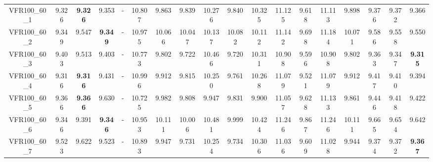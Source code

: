 \begin{tabular}{cc|ccc|ccccccccccccc}
VFR100\_60\_1      & 9.326            & {\bf 9.326}      & 9.353            & -                & 10.807           & 9.863            & 9.839            & 10.276           & 9.840            & 10.325           & 11.125           & 9.618            & 11.113           & 9.898            & 9.376            & 9.372            & 9.366           \\ 
VFR100\_60\_2      & 9.349            & 9.547            & {\bf 9.349}      & -                & 10.975           & 10.066           & 10.047           & 10.137           & 10.082           & 10.112           & 11.142           & 9.698            & 11.184           & 10.071           & 9.586            & 9.558            & 9.550           \\ 
VFR100\_60\_3      & 9.403            & 9.513            & 9.403            & -                & 10.773           & 9.802            & 9.722            & 10.466           & 9.720            & 10.311           & 10.908           & 9.596            & 10.908           & 9.802            & 9.363            & 9.347            & {\bf 9.315}     \\ 
VFR100\_60\_4      & 9.316            & {\bf 9.316}      & 9.431            & -                & 10.996           & 9.912            & 9.815            & 10.250           & 9.761            & 10.268           & 11.079           & 9.521            & 11.079           & 9.912            & 9.417            & 9.410            & 9.394           \\ 
VFR100\_60\_5      & 9.366            & {\bf 9.366}      & 9.630            & -                & 10.725           & 9.982            & 9.808            & 9.947            & 9.831            & 9.900            & 11.057           & 9.628            & 11.133           & 9.861            & 9.446            & 9.418            & 9.422           \\ 
VFR100\_60\_6      & 9.346            & 9.391            & {\bf 9.346}      & -                & 10.953           & 10.111           & 10.006           & 10.481           & 9.999            & 10.424           & 11.246           & 9.867            & 11.246           & 10.111           & 9.665            & 9.654            & 9.642           \\ 
VFR100\_60\_7      & 9.523            & 9.622            & 9.523            & -                & 10.893           & 9.947            & 9.731            & 10.254           & 9.734            & 10.306           & 11.036           & 9.609            & 11.028           & 9.944            & 9.374            & 9.372            & {\bf 9.367}     \\ 

\end{tabular}
